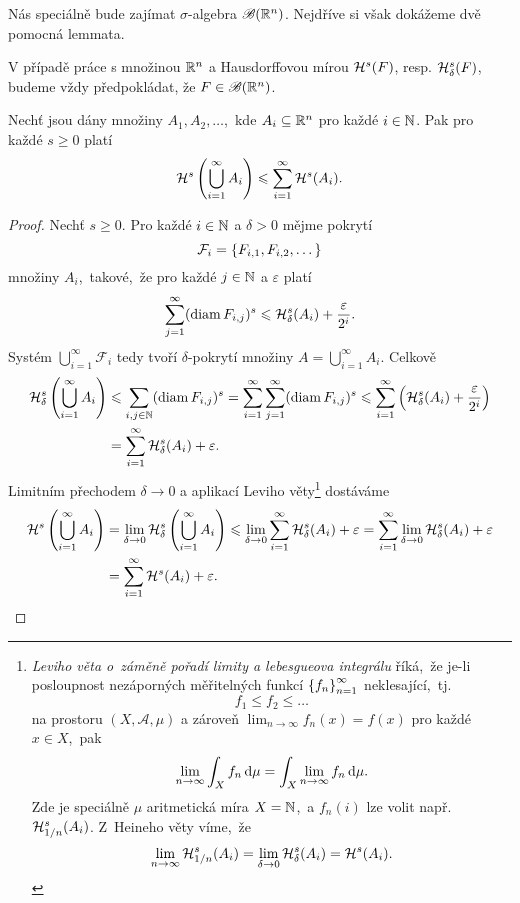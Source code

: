 Nás speciálně bude zajímat $\sigma$-algebra $\borelsigmaalgebra(\R^n)$. Nejdříve si však dokážeme dvě pomocná lemmata.
\begin{remark}
    V případě práce s množinou $\R^n$ a Hausdorffovou mírou $\hausdorffmeasure{s}(F)$, resp. $\hausdorffdeltameasure{s}{\delta}(F)$, budeme vždy předpokládat, že $F\in\borelsigmaalgebra(\R^n)$.
\end{remark}
\begin{lemma}\label{lem:Hausdorffova-mira-subaditivita}
    Nechť jsou dány množiny $A_1,A_2,\ldots$,~kde $A_i\subseteq\R^n$ pro každé $i\in\N$. Pak pro každé $s\geqslant 0$ platí
    \[\hausdorffmeasure{s}\left(\bigcup_{i=1}^\infty A_i\right)\leqslant\sum_{i=1}^{\infty}\hausdorffmeasure{s}(A_i).\]
\end{lemma}
\begin{proof}
    Nechť $s\geqslant 0$. Pro každé $i\in\N$ a $\delta>0$ mějme pokrytí
    \[\mathcal{F}_i=\set{F_{i,1},F_{i,2},\dots}\]
    množiny $A_i$,~takové,~že pro každé $j\in\N$ a $\varepsilon$ platí
    \[\sum_{j=1}^{\infty}(\diam{F_{i,j}})^s\leqslant\hausdorffdeltameasure{s}{\delta}(A_i)+\dfrac{\varepsilon}{2^i}.\]
    Systém $\bigcup_{i=1}^\infty\mathcal{F}_i$ tedy tvoří $\delta$-pokrytí množiny $A=\bigcup_{i=1}^\infty A_i$. Celkově
    \begin{align*}
        \hausdorffdeltameasure{s}{\delta}\left(\bigcup_{i=1}^\infty A_i\right)&\leqslant\sum_{i,j\in\N}(\diam{F_{i,j}})^s=\sum_{i=1}^{\infty}\sum_{j=1}^{\infty}(\diam{F_{i,j}})^s\leqslant\sum_{i=1}^{\infty}\left(\hausdorffdeltameasure{s}{\delta}(A_i)+\dfrac{\varepsilon}{2^i}\right)\\
        &=\sum_{i=1}^{\infty}\hausdorffdeltameasure{s}{\delta}(A_i)+\varepsilon.
    \end{align*}
    Limitním přechodem $\delta\to 0$ a aplikací Leviho věty\footnote{\emph{Leviho věta o~záměně pořadí limity a lebesgueova integrálu} říká,~že je-li posloupnost nezáporných měřitelných funkcí $\set{f_n}_{n=1}^\infty$ neklesající,~tj.
    \[f_1\leqslant f_2\leqslant\dots\]
    na prostoru $(X,\mathcal{A},\mu)$ a zároveň $\lim_{n\to\infty}f_n(x)=f(x)$ pro každé $x\in X$,~pak
    \[\lim_{n\to\infty}\int_X f_n\dx[\mu]=\int_X \lim_{n\to\infty}f_n\dx[\mu].\]
    Zde je speciálně $\mu$ aritmetická míra $X=\N$,~a $f_n(i)$ lze volit např. $\hausdorffdeltameasure{s}{1/n}(A_i)$. Z~Heineho věty víme,~že
    \[\lim_{n\to\infty}\hausdorffdeltameasure{s}{1/n}(A_i)=\lim_{\delta\to 0}\hausdorffdeltameasure{s}{\delta}(A_i)=\hausdorffmeasure{s}(A_i).\]
    }
    dostáváme
    \begin{align*}
        \hausdorffmeasure{s}\left(\bigcup_{i=1}^\infty A_i\right)&=\lim_{\delta\to 0}\hausdorffdeltameasure{s}{\delta}\left(\bigcup_{i=1}^\infty A_i\right)\leqslant\lim_{\delta\to 0}\sum_{i=1}^{\infty}\hausdorffdeltameasure{s}{\delta}(A_i)+\varepsilon=\sum_{i=1}^{\infty}\lim_{\delta\to 0}\hausdorffdeltameasure{s}{\delta}(A_i)+\varepsilon\\
        &=\sum_{i=1}^{\infty}\hausdorffmeasure{s}(A_i)+\varepsilon.
    \end{align*} 
\end{proof}
